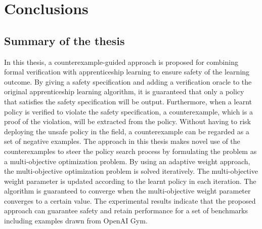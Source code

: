 \chapter{Conclusions}
\label{chapter:Conclusions}
\thispagestyle{myheadings}

\graphicspath{{3_Conclusion/Figures/}}

\section{Summary of the thesis}
In this thesis, a counterexample-guided approach is proposed for combining formal verification with apprenticeship learning to ensure safety of the learning outcome. By giving a safety specification and adding a verification oracle to the original apprenticeship learning algorithm, it is guaranteed that only a policy that satisfies the safety specification will be output. Furthermore, when a learnt policy is verified to violate the safety specification, a counterexample, which is a proof of the violation, will be extracted from the policy. Without having to risk deploying the unsafe policy in the field, a counterexample can be regarded as a set of negative examples. The approach in this thesis makes novel use of the counterexamples to steer the policy search process by formulating the problem as a multi-objective optimization problem. By using an adaptive weight approach, the multi-objective optimization problem is solved iteratively. The multi-objective weight parameter is updated according to the learnt policy in each iteration. The algorithm is guaranteed to converge when the multi-objective weight parameter converges to a certain value. The experimental results indicate that the proposed approach can guarantee safety and retain performance for a set of benchmarks including examples drawn from OpenAI Gym.

